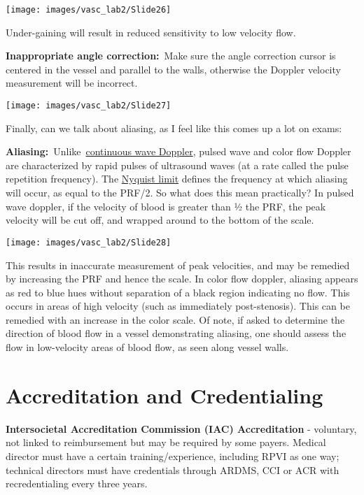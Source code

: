 \documentclass[
]{book}
\begin{document}
\texttt{[image: images/vasc\_lab2/Slide26]}

Under-gaining will result in reduced sensitivity to low velocity flow.

\textbf{Inappropriate angle correction:}~Make sure the angle correction
cursor is centered in the vessel and parallel to the walls, otherwise
the Doppler velocity measurement will be incorrect.

\texttt{[image: images/vasc\_lab2/Slide27]}

Finally, can we talk about aliasing, as I feel like this comes up a lot
on exams:

\textbf{Aliasing:}~Unlike~\href{https://radiopaedia.org/articles/continuous-wave-doppler?lang=us}{continuous wave
Doppler},
pulsed wave and color flow Doppler are characterized by rapid pulses of
ultrasound waves (at a rate called the pulse repetition frequency).
The \href{https://radiopaedia.org/articles/nyquist-limit?lang=us}{Nyquist
limit} defines
the frequency at which aliasing will occur, as equal to the PRF/2. So
what does this mean practically? In pulsed wave doppler, if the velocity
of blood is greater than ½ the PRF, the peak velocity will be cut off,
and wrapped around to the bottom of the scale.

\texttt{[image: images/vasc\_lab2/Slide28]}

This results in inaccurate measurement of peak velocities, and may be
remedied by increasing the PRF and hence the scale. In color flow
doppler, aliasing appears as red to blue hues without separation of a
black region indicating no flow. This occurs in areas of high velocity
(such as immediately post-stenosis). This can be remedied with an
increase in the color scale. Of note, if asked to determine the
direction of blood flow in a vessel demonstrating aliasing, one should
assess the flow in low-velocity areas of blood flow, as seen along
vessel walls.

\hypertarget{accreditation-and-credentialing}{%
\section{Accreditation and Credentialing}\label{accreditation-and-credentialing}}

\textbf{Intersocietal Accreditation Commission (IAC) Accreditation} -
voluntary, not linked to reimbursement but may be required by some
payers. Medical director must have a certain training/experience,
including RPVI as one way; technical directors must have credentials
through ARDMS, CCI or ACR with recredentialing every three
years.\citep{iac2021}
\end{document}
